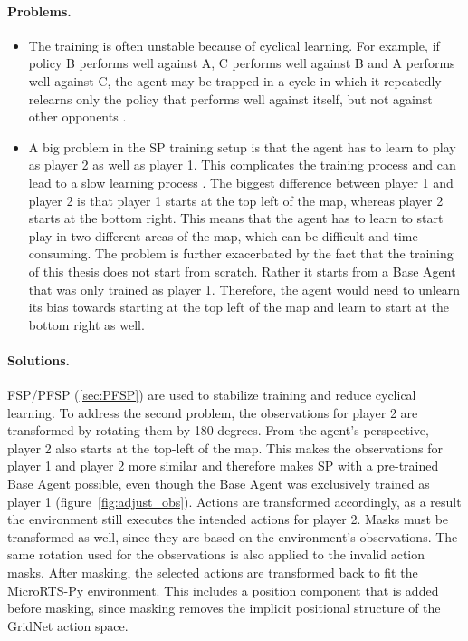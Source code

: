 \documentclass[10pt,twocolumn,letterpaper]{article}
\begin{document}
\paragraph{Problems.}
\begin{itemize}
    \item The training is often unstable because of cyclical learning.
    For example, if policy B performs well against A, C performs well against B and A performs well against C, the agent may be trapped in a cycle in which it repeatedly relearns only the policy that performs well against itself, but not against other opponents \cite{vinyals2019alphastar}.
    \item A big problem in the SP training setup is that the agent has to learn to play as player 2 as well as player 1.
    This complicates the training process and can lead to a slow learning process \cite{huang2021gym}.
    The biggest difference between player 1 and player 2 is that player 1 starts at the top left of the map, whereas player 2 starts at the bottom right.
    This means that the agent has to learn to start play in two different areas of the map, which can be difficult and time-consuming.
    The problem is further exacerbated by the fact that the training of this thesis does not start from scratch.
    Rather it starts from a Base Agent that was only trained as player 1.
    Therefore, the agent would need to unlearn its bias towards starting at the top left of the map and learn to start at the bottom right as well.
\end{itemize}

\paragraph{Solutions.}
FSP/PFSP (\ref{sec:PFSP}) are used to stabilize training and reduce cyclical learning.
To address the second problem, the observations for player 2 are transformed by rotating them by 180 degrees.
From the agent’s perspective, player 2 also starts at the top-left of the map.
This makes the observations for player 1 and player 2 more similar and therefore makes SP with a pre-trained Base Agent possible, even though the Base Agent was exclusively trained as player 1 (figure~\ref{fig:adjust_obs}).
Actions are transformed accordingly, as a result the environment still executes the intended actions for player 2.
Masks must be transformed as well, since they are based on the environment’s observations.
The same rotation used for the observations is also applied to the invalid action masks.
After masking, the selected actions are transformed back to fit the MicroRTS-Py environment.
This includes a position component that is added before masking, since masking removes the implicit positional structure of the GridNet action space.
\end{document}

